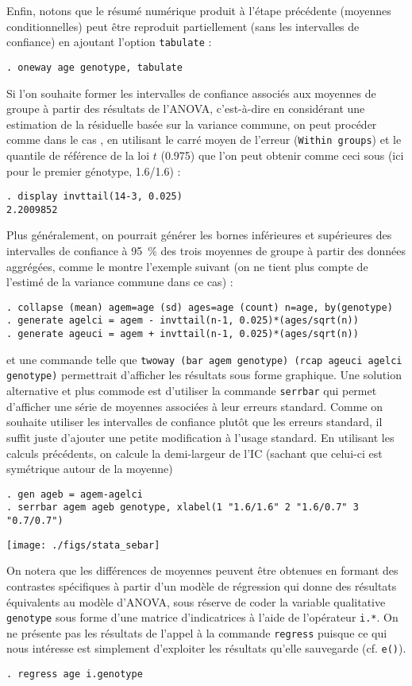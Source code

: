 Enfin, notons que le résumé numérique produit à l'étape précédente (moyennes
conditionnelles) peut être reproduit partiellement (sans les intervalles de
confiance) en ajoutant l'option \texttt{tabulate} :
\begin{verbatim}
. oneway age genotype, tabulate
\end{verbatim}
Si l'on souhaite former les intervalles de confiance associés aux moyennes
de groupe à partir des résultats de l'ANOVA, c'est-à-dire en considérant une
estimation de la résiduelle basée sur la variance commune, on peut procéder
comme dans le cas \R, en utilisant le carré moyen de l'erreur
(\texttt{Within groups}) et le quantile de référence de la loi $t$ (0.975)
que l'on peut obtenir comme ceci sous \Stata (ici pour le premier génotype,
1.6/1.6) :
\begin{verbatim}
. display invttail(14-3, 0.025)
2.2009852
\end{verbatim}

Plus généralement, on pourrait générer les bornes inférieures et supérieures
des intervalles de confiance à 95~\% des trois moyennes de groupe à partir
des données aggrégées, comme le montre l'exemple suivant (on ne tient plus
compte de l'estimé de la variance commune dans ce cas) :
\begin{verbatim}
. collapse (mean) agem=age (sd) ages=age (count) n=age, by(genotype)
. generate agelci = agem - invttail(n-1, 0.025)*(ages/sqrt(n))
. generate ageuci = agem + invttail(n-1, 0.025)*(ages/sqrt(n))
\end{verbatim}
et une commande telle que \verb|twoway (bar agem genotype) (rcap ageuci agelci genotype)|
permettrait d'afficher les résultats sous forme graphique. Une solution
alternative et plus commode est d'utiliser la commande \texttt{serrbar}  qui
permet d'afficher une série de moyennes associées à leur erreurs
standard. Comme on souhaite utiliser les intervalles de confiance plutôt que
les erreurs standard, il suffit juste d'ajouter une petite modification à
l'usage standard. En utilisant les calculs précédents, on calcule la
demi-largeur de l'IC (sachant que celui-ci est symétrique autour de la moyenne)
\begin{verbatim}
. gen ageb = agem-agelci
. serrbar agem ageb genotype, xlabel(1 "1.6/1.6" 2 "1.6/0.7" 3 "0.7/0.7")
\end{verbatim}

\texttt{[image: ./figs/stata\_sebar]}


On notera que les différences de moyennes peuvent être obtenues en formant
des contrastes spécifiques à partir d'un modèle de régression qui donne des
résultats équivalents au modèle d'ANOVA, sous réserve de coder la variable
qualitative \texttt{genotype} sous forme d'une matrice d'indicatrices à
l'aide de l'opérateur \verb|i.*|. On ne présente pas les résultats de
l'appel à la commande \texttt{regress} puisque ce qui nous intéresse est
simplement d'exploiter les résultats qu'elle sauvegarde (cf. \verb|e()|).
\begin{verbatim}
. regress age i.genotype
\end{verbatim}

